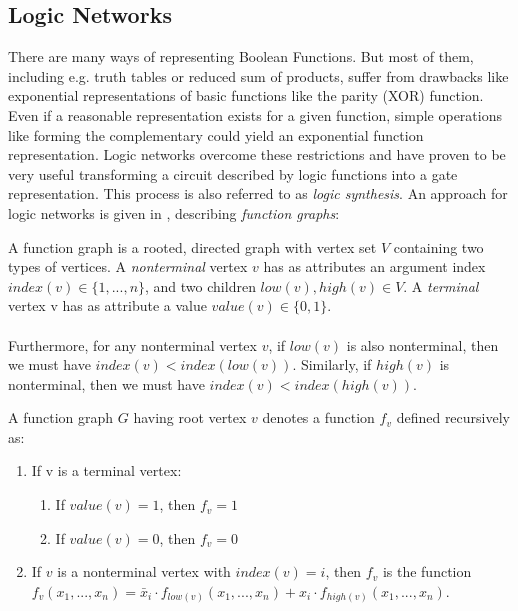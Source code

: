 \subsection{Logic Networks}

There are many ways of representing Boolean Functions. But most of them, including e.g. truth tables or reduced sum of products, suffer from drawbacks like exponential representations of basic functions like the parity (XOR) function. Even if a reasonable representation exists for a given function, simple operations like forming the complementary could yield an exponential function representation. Logic networks overcome these restrictions and have proven to be very useful transforming a circuit described by logic functions into a gate representation. This process is also referred to as \textit{logic synthesis}. An approach for logic networks is given in \cite{LogicNetwork}, describing \textit{function graphs}:

\begin{definition}
	A function graph is a rooted, directed graph with vertex set $V$ containing two types of vertices. A \textit{nonterminal} vertex $v$ has as attributes an argument index $index(v) \in \{1, . . .,n\}$, and two children $low(v),high(v) \in V$. A \textit{terminal} vertex v has as attribute a value $value(v)\in\{0,1\}$.\\
	\\
	Furthermore, for any nonterminal vertex $v$, if $low(v)$ is also nonterminal, then we must have
	$index(v) < index(low(v))$. Similarly, if $high(v)$ is nonterminal, then we must have
	$index(v) < index(high(v))$.
\end{definition}

\begin{definition}
	A function graph $G$ having root vertex $v$ denotes a function $f_v$ defined recursively as:
	\begin{enumerate}
		\item If v is a terminal vertex:
		\begin{enumerate}
			\item If $value(v)=1$, then $f_v=1$
			\item If $value(v)=0$, then $f_v=0$
		\end{enumerate}
		\item If $v$ is a nonterminal vertex with $index(v)=i$, then $f_v$ is the function \\ 
		$f_v(x_1, ..., x_n) = \bar{x}_i \cdot f_{low(v)}(x_1, ..., x_n) + x_i \cdot f_{high(v)}(x_1, ..., x_n)$.
	\end{enumerate}
\end{definition}

